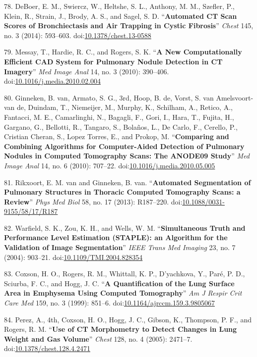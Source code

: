 \documentclass[11pt,]{article}
\begin{document}
78. DeBoer, E. M., Swiercz, W., Heltshe, S. L., Anthony, M. M., Szefler,
P., Klein, R., Strain, J., Brody, A. S., and Sagel, S. D.
``\textbf{Automated CT Scan Scores of Bronchiectasis and Air Trapping in
Cystic Fibrosis}'' \emph{Chest} 145, no. 3 (2014): 593--603.
doi:\href{http://dx.doi.org/10.1378/chest.13-0588}{10.1378/chest.13-0588}

79. Messay, T., Hardie, R. C., and Rogers, S. K. ``\textbf{A New
Computationally Efficient CAD System for Pulmonary Nodule Detection in
CT Imagery}'' \emph{Med Image Anal} 14, no. 3 (2010): 390--406.
doi:\href{http://dx.doi.org/10.1016/j.media.2010.02.004}{10.1016/j.media.2010.02.004}

80. Ginneken, B. van, Armato, S. G., 3rd, Hoop, B. de, Vorst, S. van
Amelsvoort-van de, Duindam, T., Niemeijer, M., Murphy, K., Schilham, A.,
Retico, A., Fantacci, M. E., Camarlinghi, N., Bagagli, F., Gori, I.,
Hara, T., Fujita, H., Gargano, G., Bellotti, R., Tangaro, S., Bola{ñ}os,
L., De Carlo, F., Cerello, P., Cristian Cheran, S., Lopez Torres, E.,
and Prokop, M. ``\textbf{Comparing and Combining Algorithms for
Computer-Aided Detection of Pulmonary Nodules in Computed Tomography
Scans: The ANODE09 Study}'' \emph{Med Image Anal} 14, no. 6 (2010):
707--22.
doi:\href{http://dx.doi.org/10.1016/j.media.2010.05.005}{10.1016/j.media.2010.05.005}

81. Rikxoort, E. M. van and Ginneken, B. van. ``\textbf{Automated
Segmentation of Pulmonary Structures in Thoracic Computed Tomography
Scans: a Review}'' \emph{Phys Med Biol} 58, no. 17 (2013): R187--220.
doi:\href{http://dx.doi.org/10.1088/0031-9155/58/17/R187}{10.1088/0031-9155/58/17/R187}

82. Warfield, S. K., Zou, K. H., and Wells, W. M. ``\textbf{Simultaneous
Truth and Performance Level Estimation (STAPLE): an Algorithm for the
Validation of Image Segmentation}'' \emph{IEEE Trans Med Imaging} 23,
no. 7 (2004): 903--21.
doi:\href{http://dx.doi.org/10.1109/TMI.2004.828354}{10.1109/TMI.2004.828354}

83. Coxson, H. O., Rogers, R. M., Whittall, K. P., D'yachkova, Y.,
Par{é}, P. D., Sciurba, F. C., and Hogg, J. C. ``\textbf{A
Quantification of the Lung Surface Area in Emphysema Using Computed
Tomography}'' \emph{Am J Respir Crit Care Med} 159, no. 3 (1999):
851--6.
doi:\href{http://dx.doi.org/10.1164/ajrccm.159.3.9805067}{10.1164/ajrccm.159.3.9805067}

84. Perez, A., 4th, Coxson, H. O., Hogg, J. C., Gibson, K., Thompson, P.
F., and Rogers, R. M. ``\textbf{Use of CT Morphometry to Detect Changes
in Lung Weight and Gas Volume}'' \emph{Chest} 128, no. 4 (2005):
2471--7.
doi:\href{http://dx.doi.org/10.1378/chest.128.4.2471}{10.1378/chest.128.4.2471}
\end{document}
